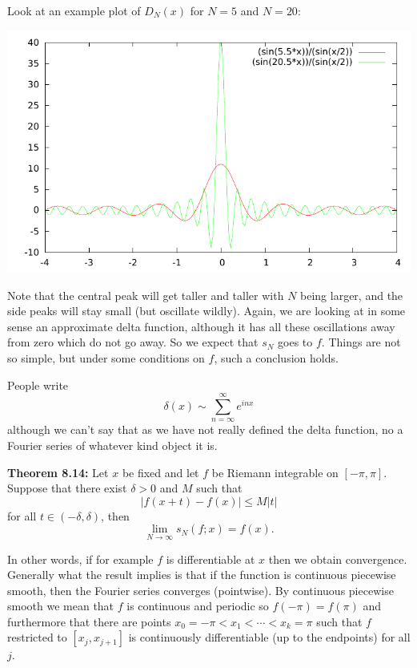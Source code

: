 \documentclass[12pt]{book}
\newcommand{\abs}[1]{\left\lvert {#1} \right\rvert}
\theoremstyle{plain}
\theoremstyle{remark}
\theoremstyle{definition}
\theoremstyle{exercise}
\theoremstyle{example}
\begin{document}
Look at an example plot of $D_N(x)$ for $N=5$ and $N=20$:
\begin{center}
\includegraphics{dirich.pdf}
\end{center}

Note that the central peak will get taller and taller with $N$ being larger,
and the side peaks will stay small (but oscillate wildly).
Again, we are looking at in some sense an approximate delta function,
although it has
all these oscillations away from zero which do not go away.  So we expect that
$s_N$ goes to $f$.  Things are not so simple, but under some conditions on
$f$, such a conclusion holds.

People write
$$
\delta(x) \sim \sum_{n=\infty}^\infty e^{inx}
$$
although we can't say that as
we have not really defined the delta function, no a Fourier series of
whatever kind object it is.


\medskip

\textbf{Theorem 8.14:}
Let $x$ be fixed and let $f$ be Riemann integrable on $[-\pi,\pi]$.  Suppose that there exist $\delta > 0$ and $M$ such that
$$
\abs{f(x+t)-f(x)} \leq M \abs{t}
$$
for all $t \in (-\delta,\delta)$, then
$$
\lim_{N \to \infty} s_N(f;x) = f(x) .
$$

\medskip

In other words, if for example $f$ is differentiable at $x$
then we obtain convergence.  Generally what the result implies is
that if the function is continuous
piecewise smooth, then the Fourier series converges
(pointwise).   By continuous piecewise smooth we mean that $f$
is continuous and periodic so $f(-\pi) = f(\pi)$ and furthermore
that there are points $x_0 = -\pi < x_1 < \cdots < x_k = \pi$
such that $f$ restricted to $[x_j,x_{j+1}]$
is continuously differentiable (up to the endpoints) for all $j$.
\end{document}
